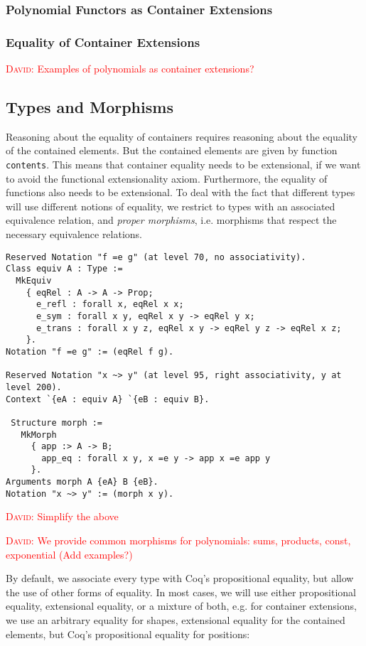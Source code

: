 \documentclass[a4paper, UKenglish, cleveref, autoref, thm-restate]{lipics-v2021}
\newcommand{\dcas}[1]{\textcolor{red}{\textsc{David}: #1}}
\begin{document}
\subsubsection{Polynomial Functors as Container Extensions}

\subsubsection{Equality of Container Extensions}

\dcas{Examples of polynomials as container extensions?}

\subsection{Types and Morphisms}

Reasoning about the equality of containers requires reasoning about the
equality of the contained elements. But the contained elements are given by
function \texttt{contents}. This means that container equality needs
to be extensional, if we want to avoid the functional extensionality axiom.
Furthermore, the equality of functions also needs to be extensional. To deal
with the fact that different types will use different notions of equality, we
restrict to types with an associated equivalence relation, and \emph{proper
morphisms}, i.e. morphisms that respect the necessary equivalence relations.

\begin{verbatim}
Reserved Notation "f =e g" (at level 70, no associativity).
Class equiv A : Type :=
  MkEquiv
    { eqRel : A -> A -> Prop;
      e_refl : forall x, eqRel x x;
      e_sym : forall x y, eqRel x y -> eqRel y x;
      e_trans : forall x y z, eqRel x y -> eqRel y z -> eqRel x z;
    }.
Notation "f =e g" := (eqRel f g).

Reserved Notation "x ~> y" (at level 95, right associativity, y at level 200).
Context `{eA : equiv A} `{eB : equiv B}.

 Structure morph :=
   MkMorph
     { app :> A -> B;
       app_eq : forall x y, x =e y -> app x =e app y
     }.
Arguments morph A {eA} B {eB}.
Notation "x ~> y" := (morph x y).
\end{verbatim}
\dcas{Simplify the above}

\dcas{We provide common morphisms for polynomials: sums, products, const,
exponential (Add examples?)}

By default, we associate every type with Coq's propositional equality, but allow
the use of other forms of equality. In most cases, we will use either
propositional equality, extensional equality, or a mixture of both, e.g. for
container extensions, we use an arbitrary equality for shapes, extensional
equality for the contained elements, but Coq's propositional equality for
positions:
\end{document}
